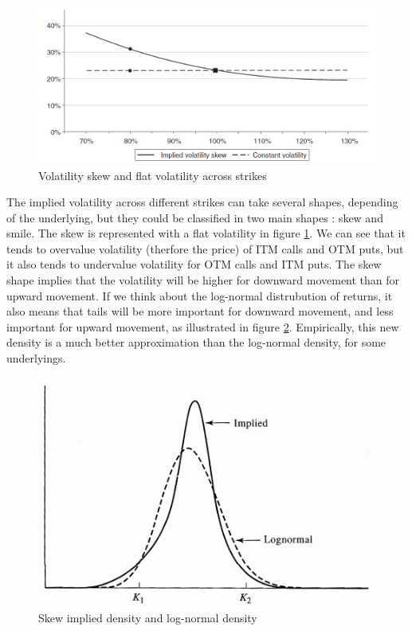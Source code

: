 \documentclass[hidelinks]{article}
\theoremstyle{definition}
\begin{document}
\begin{figure}[!h]
	\centering
	\includegraphics[width=\textwidth]{skew.png}
    \caption{Volatility skew and flat volatility across strikes}
    \label{fig:skew}
    \end{figure}
    
    The implied volatility across different strikes can take several shapes, depending of the underlying, but they could be classified in two main shapes : skew and smile. The skew is represented with a flat volatility in figure \ref{fig:skew}. We can see that it tends to overvalue volatility (therfore the price) of ITM calls and OTM puts, but it also tends to undervalue volatility for OTM calls and ITM puts. The skew shape implies that the volatility will be higher for downward movement than for upward movement. If we think about the log-normal distrubution of returns, it also means that tails will be more important for downward movement, and less important for upward movement, as illustrated in figure \ref{fig:skew_density}. Empirically, this new density is a much better approximation than the log-normal density, for some underlyings.
    
    \begin{figure}[!h]
	\centering
	\includegraphics[width=\textwidth]{skew_density.png}
    \caption{Skew implied density and log-normal density}
    \label{fig:skew_density}
    \end{figure}
    
\end{document}
